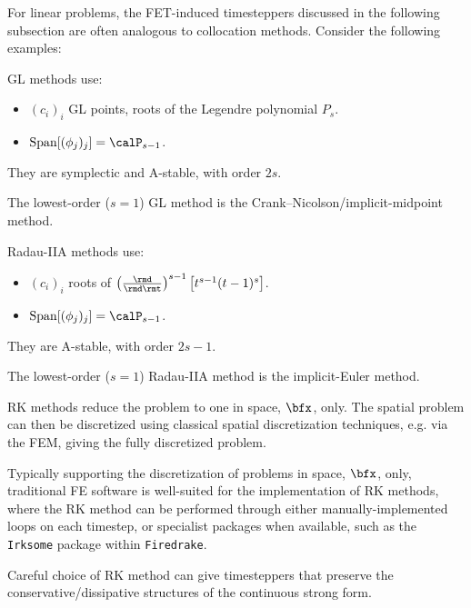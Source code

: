     For linear problems, the FET-induced timesteppers discussed in the following subsection are often analogous to collocation methods. Consider the following examples:

    \begin{example}
        GL methods use:
        \begin{itemize}
            \item  $(c_{i})_{i}$ GL points, roots of the Legendre polynomial $P_{s}$.
            \item  ${\rm Span}[(\phi_{j})_{j}]  =  \calP_{s - 1}$.
        \end{itemize}
        They are symplectic \cite{Lasagni_1988, Sanz--Serna_1988} and A-stable, with order $2s$.

        The lowest-order ($s  =  1$) GL method is the Crank--Nicolson/implicit-midpoint method.
    \end{example}

    \begin{example}
        Radau-IIA methods use:
        \begin{itemize}
            \item  $(c_{i})_{i}$ roots of $\left(\frac{\rmd}{\rmd\rmt}\right)^{s - 1}\left[t^{s - 1}(t - 1)^{s}\right]$.
            \item  ${\rm Span}[(\phi_{j})_{j}]  =  \calP_{s - 1}$.
        \end{itemize}
        They are A-stable, with order $2s - 1$.

        The lowest-order ($s  =  1$) Radau-IIA method is the implicit-Euler method.
    \end{example}
    
    \line
    
    RK methods reduce the problem to one in space, $\bfx$, only. The spatial problem can then be discretized using classical spatial discretization techniques, e.g. via the FEM, giving the fully discretized problem.
    
    Typically supporting the discretization of problems in space, $\bfx$, only, traditional FE software is well-suited for the implementation of RK methods, where the RK method can be performed through either manually-implemented loops on each timestep, or specialist packages when available, such as the {\tt Irksome} package within {\tt Firedrake}. \cite{Farrell_Kirby_Marchena-Menéndez_2021}

    Careful choice of RK method can give timesteppers that preserve the conservative/dissipative structures of the continuous strong form.

